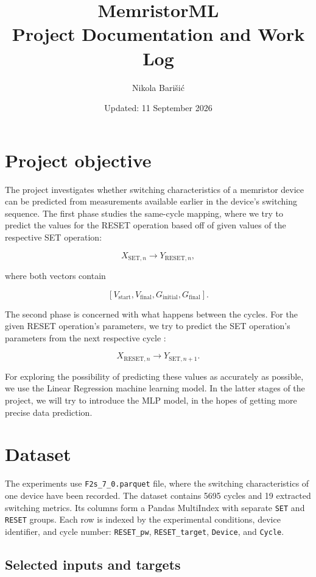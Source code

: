 \documentclass[11pt,a4paper]{article}
\title{MemristorML\\Project Documentation and Work Log}
\author{Nikola Bari\v{s}i\'{c}}
\date{Updated: 11 September 2026}
\begin{document}
\maketitle
\tableofcontents
\newpage

\section{Project objective}

The project investigates whether switching characteristics of a memristor device can
be predicted from measurements available earlier in the device's switching
sequence. The first phase studies the same-cycle mapping, where we try to predict the values for the RESET operation based off of given values of the respective SET operation:

\[
X_{\mathrm{SET},n}
\longrightarrow
Y_{\mathrm{RESET},n},
\]

where both vectors contain

\[
[V_{\mathrm{start}},V_{\mathrm{final}},G_{\mathrm{initial}},
G_{\mathrm{final}}].
\]

The second phase is concerned with what happens between the cycles. For the given RESET operation's parameters, we try to predict the SET operation's parameters from the next respective cycle :

\[
X_{\mathrm{RESET},n}
\longrightarrow
Y_{\mathrm{SET},n+1}.
\]

For exploring the possibility of predicting these values as accurately as possible, we use the Linear Regression machine learning model. In the latter stages of the project, we will try to introduce the MLP model, in the hopes of getting more precise data prediction.

\section{Dataset}

The experiments use \texttt{F2s\_7\_0.parquet} file, where the switching characteristics of one device have been recorded. The dataset contains 5695 cycles and 19 extracted switching metrics. Its columns form a Pandas
MultiIndex with separate \texttt{SET} and \texttt{RESET} groups. Each row is indexed by the experimental conditions, device identifier, and cycle number:
\texttt{RESET\_pw}, \texttt{RESET\_target}, \texttt{Device}, and
\texttt{Cycle}.

\subsection{Selected inputs and targets}
\end{document}
